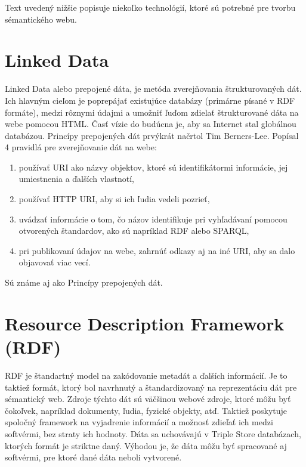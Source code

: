 \documentclass[12pt, a4paper, oneside]{book}
\begin{document}
Text uvedený nižšie popisuje niekoľko technológií, ktoré sú potrebné pre tvorbu sémantického webu.

\section{Linked Data}



Linked Data \cite{linkeddata} alebo prepojené dáta, je metóda zverejňovania štrukturovaných dát. Ich hlavným cieľom je poprepájať existujúce databázy (primárne písané v RDF formáte), medzi rôznymi údajmi a umožniť ľuďom zdielať štrukturované dáta na webe pomocou HTML. Časť vízie do budúcna je, aby sa Internet stal globálnou databázou. Princípy prepojených dát prvýkrát načrtol Tim Berners-Lee. Popísal 4 pravidlá pre zverejňovanie dát na webe:
\begin{enumerate}
  \item používať URI ako názvy objektov, ktoré sú identifikátormi informácie, jej umiestnenia a ďalších vlastnotí,
  \item používať HTTP URI, aby si ich ľudia vedeli pozrieť,
  \item uvádzať informácie o tom, čo názov identifikuje pri vyhľadávaní pomocou otvorených štandardov, ako sú napríklad RDF alebo SPARQL,
  \item pri publikovaní údajov na webe, zahrnúť odkazy aj na iné URI, aby sa dalo objavovať viac vecí.
\end{enumerate}
Sú známe aj ako Princípy prepojených dát.



\section{Resource Description Framework (RDF)}

RDF \cite{rdf} je štandartný model na zakódovanie metadát a ďalších informácií. Je to taktiež formát, ktorý bol navrhnutý a štandardizovaný na reprezentáciu dát pre sémantický web. Zdroje týchto dát sú väčšinou webové zdroje, ktoré môžu byť čokoľvek, napríklad dokumenty, ľudia, fyzické objekty, atď. Taktiež poskytuje spoločný framework na vyjadrenie informácií a možnosť zdieľať ich medzi softvérmi, bez straty ich hodnoty. Dáta sa uchovávajú v Triple Store databázach, ktorých formát je striktne daný. Výhodou je, že dáta môžu byť spracované aj softvérmi, pre ktoré dané dáta neboli vytvorené.
\end{document}
